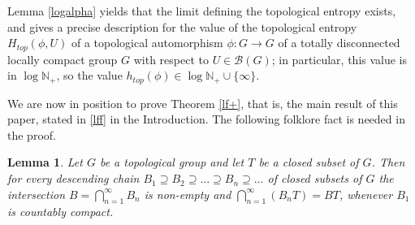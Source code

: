 \documentclass[11pt]{article}
\newtheorem{lemma}[theorem]{Lemma}
\newtheorem{corollary}[theorem]{Corollary}
\theoremstyle{definition}
\newcommand{\N}{\mathbb N}
\numberwithin{equation}{section}
\begin{document}
Lemma \ref{logalpha} yields that the limit defining the topological entropy exists, and gives a precise description for the value of the topological entropy $H_{top}(\phi,U)$ of a topological automorphism $\phi:G\to G$ of a totally disconnected locally compact group $G$ with respect to $U\in\mathcal B(G)$; in particular, this value is in $\log\N_+$, so the value $h_{top}(\phi)\in\log\N_+\cup\{\infty\}$. %
%

\medskip
We are now in position to prove Theorem \ref{lf+}, that is, the main result of this paper, stated in \eqref{lff} in the Introduction. The following folklore fact is needed in the proof. %

\begin{lemma}\emph{\cite{DG-limitfree}}\label{intersect}
Let $G$ be a topological group and let $T$ be a closed subset of $G$. Then for every descending chain 
$B_1 \supseteq B_2 \supseteq \ldots \supseteq B_n \supseteq  \ldots$ of closed subsets of $G$ the intersection $B = \bigcap_{n=1}^\infty B_n $ is non-empty and 
 $\bigcap_{n=1}^\infty (B_{n} T)= B T$, whenever $B_1$ is countably compact. 
\end{lemma}
%
\end{document}
